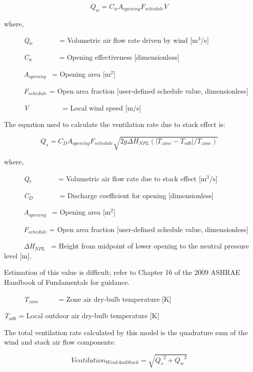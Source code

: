 \begin{equation}
{Q_w} = {C_w}{A_{opening}}{F_{schedule}}V
\end{equation}

where,

~~~~~ \emph{Q\(_{w}\)}~~~~~~~ = Volumetric air flow rate driven by wind {[}m\(^{3}\)/s{]}

~~~~~ \emph{C\(_{w}\)}~~~~~~~ = Opening effectiveness {[}dimensionless{]}

~~~~~ \emph{A\(_{opening}\)}~ = Opening area {[}m\(^{2}\){]}

~~~~~ \emph{F\(_{schedule}\)} = Open area fraction {[}user-defined schedule value, dimensionless{]}

~~~~~ \emph{V}~~~~~~~~~ = Local wind speed {[}m/s{]}

The equation used to calculate the ventilation rate due to stack effect is:

\begin{equation}
{Q_s} = {C_D}{A_{opening}}{F_{schedule}}\sqrt {2g\Delta {H_{NPL}}(|{T_{zone}} - {T_{odb}}|/{T_{zone}})}
\end{equation}

where,

~~~~~ \emph{Q\(_{s}\)}~~~~~~~ = Volumetric air flow rate due to stack effect {[}m\(^{3}\)/s{]}

~~~~~ \emph{C\(_{D}\)}~~~~~~~ = Discharge coefficient for opening {[}dimensionless{]}

~~~~~ \emph{A\(_{opening}\)}~ = Opening area {[}m\(^{2}\){]}

~~~~~ \emph{F\(_{schedule}\)} = Open area fraction {[}user-defined schedule value, dimensionless{]}

~~~~~ \emph{ΔH\(_{NPL}\)}~ = Height from midpoint of lower opening to the neutral pressure level {[}m{]}.

Estimation of this value is difficult; refer to Chapter 16 of the 2009 ASHRAE Handbook of Fundamentals for guidance.

~~~~~ \emph{T\(_{zone}\)}~~~~~ = Zone air dry-bulb temperature {[}K{]}

\emph{T\(_{odb}\)} = Local outdoor air dry-bulb temperature {[}K{]}

The total ventilation rate calculated by this model is the quadrature sum of the wind and stack air flow components:

\begin{equation}
Ventilatio{n_{WindAndStack}} = \sqrt {{Q_s}^2 + {Q_w}^2}
\end{equation}

